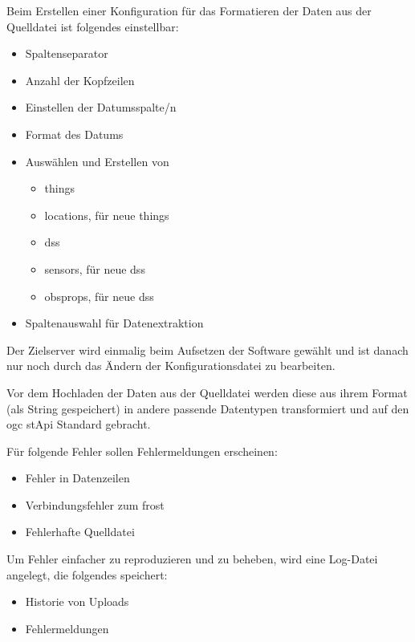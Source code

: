 \documentclass[a4paper, 12 pt]{article}
\begin{document}
	Beim Erstellen einer Konfiguration für das Formatieren der Daten aus der Quelldatei ist folgendes einstellbar:
	\begin{itemize}
			\item Spaltenseparator
			\item Anzahl der Kopfzeilen
			\item Einstellen der Datumsspalte/n
			\item Format des Datums
			\item Auswählen und Erstellen von
			\begin{itemize}
				\item \glspl{thing}
				\item \glspl{location}, für neue \glspl{thing}
				\item \glspl{ds}
				\item \gls{sensor}s, für neue \glspl{ds}
				\item \glspl{obsprop}, für neue \glspl{ds}
			\end{itemize}
			\item Spaltenauswahl für Datenextraktion
		\end{itemize}
	
	Der Zielserver wird einmalig beim Aufsetzen der Software gewählt und ist danach nur noch durch das Ändern der Konfigurationsdatei zu bearbeiten.
	
	
	Vor dem Hochladen der Daten aus der Quelldatei werden diese aus ihrem Format (als String gespeichert) in andere passende Datentypen transformiert und auf den \gls{ogc} \gls{stApi} Standard gebracht.
	
	Für folgende Fehler sollen Fehlermeldungen erscheinen:
	\begin{itemize}
			\item Fehler in Datenzeilen
			\item Verbindungsfehler zum \gls{frost}
			\item Fehlerhafte Quelldatei
		\end{itemize}
	
	Um Fehler einfacher zu reproduzieren und zu beheben, wird eine Log-Datei angelegt, die folgendes speichert:
	\begin{itemize}
			\item Historie von Uploads
			\item Fehlermeldungen
		\end{itemize}
	
\end{document}
